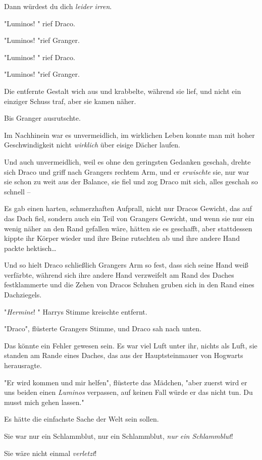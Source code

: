 {Dann würdest du dich \emph{leider} \emph{irren}.

"Luminos! " rief Draco.

"Luminos! "rief Granger.

"Luminos! " rief Draco.

"Luminos! "rief Granger.

Die entfernte Gestalt wich aus und krabbelte, während sie lief, und nicht ein einziger Schuss traf, aber sie kamen näher.

Bis Granger ausrutschte.

Im Nachhinein war es unvermeidlich, im wirklichen Leben konnte man mit hoher Geschwindigkeit nicht \emph{wirklich} über eisige Dächer laufen.

Und auch unvermeidlich, weil es ohne den geringsten Gedanken geschah, drehte sich Draco und griff nach Grangers rechtem Arm, und er \emph{erwischte} sie, nur war sie schon zu weit aus der Balance, sie fiel und zog Draco mit sich, alles geschah so schnell --

Es gab einen harten, schmerzhaften Aufprall, nicht nur Dracos Gewicht, das auf das Dach fiel, sondern auch ein Teil von Grangers Gewicht, und wenn sie nur ein wenig näher an den Rand gefallen wäre, hätten sie es geschafft, aber stattdessen kippte ihr Körper wieder und ihre Beine rutschten ab und ihre andere Hand packte hektisch…

Und so hielt Draco schließlich Grangers Arm so fest, dass sich seine Hand weiß verfärbte, während sich ihre andere Hand verzweifelt am Rand des Daches festklammerte und die Zehen von Dracos Schuhen gruben sich in den Rand eines Dachziegels.

"\emph{Hermine}! " Harrys Stimme kreischte entfernt.

"Draco", flüsterte Grangers Stimme, und Draco sah nach unten.

Das könnte ein Fehler gewesen sein. Es war viel Luft unter ihr, nichts als Luft, sie standen am Rande eines Daches, das aus der Hauptsteinmauer von Hogwarts herausragte.

"Er wird kommen und mir helfen", flüsterte das Mädchen, "aber zuerst wird er uns beiden einen \emph{Luminos} verpassen, auf keinen Fall würde er das nicht tun. Du musst mich gehen lassen."

Es hätte die einfachste Sache der Welt sein sollen.

Sie war nur ein Schlammblut, nur ein Schlammblut, \emph{nur ein Schlammblut}!

Sie wäre nicht einmal \emph{verletzt}!

}
